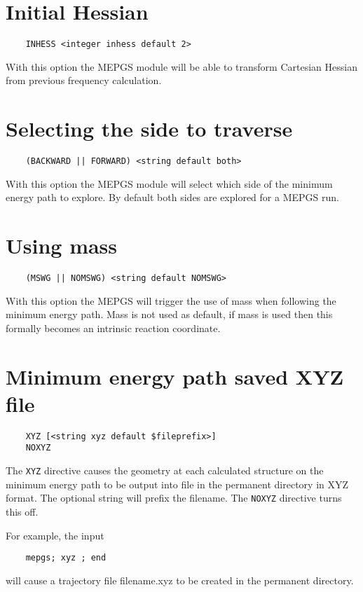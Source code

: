 \section{Initial Hessian}
\begin{verbatim}
    INHESS <integer inhess default 2>
\end{verbatim}

With this option the MEPGS module will be able to transform
Cartesian Hessian from previous frequency calculation.

\section{Selecting the side to traverse}
\begin{verbatim}
    (BACKWARD || FORWARD) <string default both>
\end{verbatim}

With this option the MEPGS module will select which side of the 
minimum energy path to explore. By default both sides are explored
for a MEPGS run.

\section{Using mass}
\begin{verbatim}
    (MSWG || NOMSWG) <string default NOMSWG>
\end{verbatim}

With this option the MEPGS will trigger the use of mass when following the 
minimum energy path. Mass is not used as default, if mass is used then 
this formally becomes an intrinsic reaction coordinate.  

\section{Minimum energy path saved XYZ file}

\begin{verbatim}
    XYZ [<string xyz default $fileprefix>]
    NOXYZ
\end{verbatim}

The \verb+XYZ+ directive causes the geometry at each calculated 
structure on the minimum energy path to be output into file in the 
permanent directory in XYZ format. 
The optional string will
prefix the filename.  The \verb+NOXYZ+ directive turns this off.

For example, the input
\begin{verbatim}
    mepgs; xyz ; end
\end{verbatim}
will cause a trajectory file filename.xyz to be created
in the permanent directory.  

